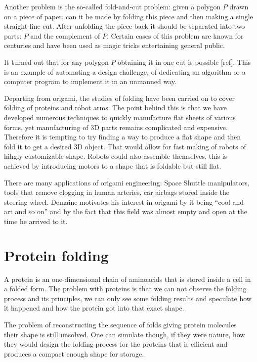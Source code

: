 \documentclass[a4paper,12pt]{article}
\begin{document}
Another problem is the so-called fold-and-cut problem: given a polygon \(P\) drawn on a piece of paper, can it be made by folding this piece and then making a single straight-line cut. After unfolding the piece back it should be separated into two parts: \(P\) and the complement of \(P\). Certain cases of this problem are known for centuries and have been used as magic tricks entertaining general public.

It turned out that for any polygon \(P\) obtaining it in one cut is possible [ref]. This is an example of automating a design challenge, of dedicating an algorithm or a computer program to implement it in an unmanned way.

Departing from origami, the studies of folding have been carried on to cover folding of proteins and robot arms. The point behind this is that we have developed numerous techniques to quickly manufacture flat sheets of various forms, yet manufacturing of 3D parts remains complicated and expensive. Therefore it is tempting to try finding a way to produce a flat shape and then fold it to get a desired 3D object. That would allow for fast making of robots of hihgly customizable shape. Robots could also assemble themselves, this is achieved by introducing motors to a shape that is foldable but still flat.

There are many applications of origami engineering: Space Shuttle manipulators, tools that remove clogging in human arteries, car airbags stored inside the steering wheel. Demaine motivates his interest in origami by it being “cool and art and so on” and by the fact that this field was almost empty and open at the time he arrived to it.

\section{Protein folding}

A protein is an one-dimensional chain of aminoacids that is stored inside a cell in a folded form. The problem with proteins is that we can not observe the folding process and its principles, we can only see some folding results and speculate how it happened and how the protein got into that exact shape.

The problem of reconstructing the sequence of folds giving protein molecules their shape is still unsolved. One can simulate though, if they were nature, how they would design the folding process for the proteins that is efficient and produces a compact enough shape for storage.
\end{document}
